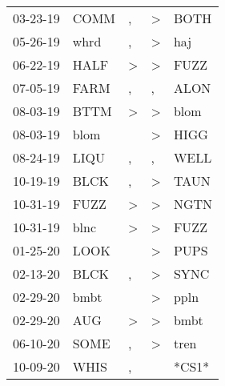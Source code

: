 \begin{supertabular}{p{0.07\textwidth}p{0.06\textwidth}p{0.02\textwidth}p{0.02\textwidth}p{0.06\textwidth}}
          03-23-19\textsuperscript{} &           COMM\textsuperscript{} &                , &     \textgreater &           BOTH\textsuperscript{} \\
          05-26-19\textsuperscript{} &           whrd\textsuperscript{} &                , &     \textgreater &            haj\textsuperscript{} \\
          06-22-19\textsuperscript{} &           HALF\textsuperscript{} &     \textgreater &     \textgreater &           FUZZ\textsuperscript{} \\
          07-05-19\textsuperscript{} &           FARM\textsuperscript{} &                , &                , &           ALON\textsuperscript{} \\
          08-03-19\textsuperscript{} &           BTTM\textsuperscript{} &     \textgreater &     \textgreater &           blom\textsuperscript{} \\
          08-03-19\textsuperscript{} &           blom\textsuperscript{} &                  &     \textgreater &           HIGG\textsuperscript{} \\
          08-24-19\textsuperscript{} &           LIQU\textsuperscript{} &                , &                , &           WELL\textsuperscript{} \\
          10-19-19\textsuperscript{} &           BLCK\textsuperscript{} &                , &     \textgreater &           TAUN\textsuperscript{} \\
          10-31-19\textsuperscript{} &           FUZZ\textsuperscript{} &     \textgreater &     \textgreater &           NGTN\textsuperscript{} \\
          10-31-19\textsuperscript{} &           blnc\textsuperscript{} &     \textgreater &     \textgreater &           FUZZ\textsuperscript{} \\
          01-25-20\textsuperscript{} &           LOOK\textsuperscript{} &                  &     \textgreater &           PUPS\textsuperscript{} \\
          02-13-20\textsuperscript{} &           BLCK\textsuperscript{} &                , &     \textgreater &           SYNC\textsuperscript{} \\
          02-29-20\textsuperscript{} &           bmbt\textsuperscript{} &                  &     \textgreater &           ppln\textsuperscript{} \\
          02-29-20\textsuperscript{} &            AUG\textsuperscript{} &     \textgreater &     \textgreater &           bmbt\textsuperscript{} \\
          06-10-20\textsuperscript{} &           SOME\textsuperscript{} &                , &     \textgreater &           tren\textsuperscript{} \\
          10-09-20\textsuperscript{} &           WHIS\textsuperscript{} &                , &                  &                            *CS1* \\
\end{supertabular}
